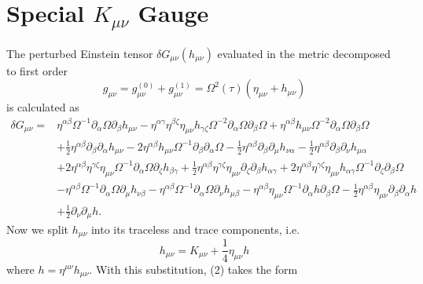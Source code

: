\documentclass[10pt,letterpaper]{article}
\begin{document}
\section*{Special $K_{\mu\nu}$ Gauge}
The perturbed Einstein tensor $\delta  G_{\mu\nu}( h_{\mu\nu})$ evaluated in the metric decomposed to first order 
\begin{equation}
g_{\mu\nu} = g^{(0)}_{\mu\nu} + g^{(1)}_{\mu\nu} = \Omega^2(\tau)(\eta_{\mu\nu}+h_{\mu\nu})
\end{equation}
is calculated as 
\begin{align}
\delta G_{\mu\nu}={}&\eta^{\alpha \beta} \Omega^{-1} \partial_{\alpha}\Omega \partial_{\beta}h_{\mu \nu}
 -  \eta^{\alpha \gamma} \eta^{\beta \zeta} \eta_{\mu \nu} h_{\gamma \zeta} \Omega^{-2} \partial_{\alpha}\Omega \partial_{\beta}\Omega
 + \eta^{\alpha \beta} h_{\mu \nu} \Omega^{-2} \partial_{\alpha}\Omega \partial_{\beta}\Omega\nonumber\\
& + \tfrac{1}{2} \eta^{\alpha \beta} \partial_{\beta}\partial_{\alpha}h_{\mu \nu}
 - 2 \eta^{\alpha \beta} h_{\mu \nu} \Omega^{-1} \partial_{\beta}\partial_{\alpha}\Omega
 -  \tfrac{1}{2} \eta^{\alpha \beta} \partial_{\beta}\partial_{\mu}h_{\nu \alpha}
 -  \tfrac{1}{2} \eta^{\alpha \beta} \partial_{\beta}\partial_{\nu}h_{\mu \alpha}\nonumber\\
& + 2 \eta^{\alpha \beta} \eta^{\gamma \zeta} \eta_{\mu \nu} \Omega^{-1} \partial_{\alpha}\Omega \partial_{\zeta}h_{\beta \gamma}
 + \tfrac{1}{2} \eta^{\alpha \beta} \eta^{\gamma \zeta} \eta_{\mu \nu} \partial_{\zeta}\partial_{\beta}h_{\alpha \gamma}
 + 2 \eta^{\alpha \beta} \eta^{\gamma \zeta} \eta_{\mu \nu} h_{\alpha \gamma} \Omega^{-1} \partial_{\zeta}\partial_{\beta}\Omega\nonumber\\
& -  \eta^{\alpha \beta} \Omega^{-1} \partial_{\alpha}\Omega \partial_{\mu}h_{\nu \beta}
 -  \eta^{\alpha \beta} \Omega^{-1} \partial_{\alpha}\Omega \partial_{\nu}h_{\mu \beta}- \eta^{\alpha \beta} \eta_{\mu \nu} \Omega^{-1} \partial_{\alpha}h \partial_{\beta}\Omega -  \tfrac{1}{2} \eta^{\alpha \beta} \eta_{\mu \nu} \partial_{\beta}\partial_{\alpha}h\nonumber \\
& + \tfrac{1}{2} \partial_{\nu}\partial_{\mu}h.
\end{align}
Now we split $h_{\mu\nu}$ into its traceless and trace components, i.e.
\begin{equation}
	h_{\mu\nu} = K_{\mu\nu} + \frac 14 \eta_{\mu\nu}h
\end{equation}
where $h = \eta^{\mu\nu}h_{\mu\nu}$. With this substitution, (2) takes the form
\end{document}
